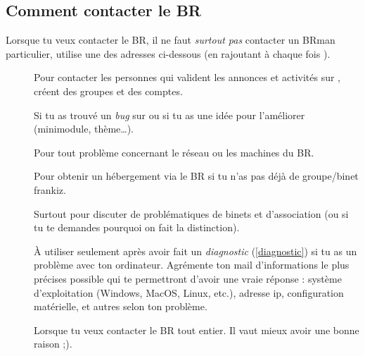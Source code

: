 \subsection{Comment contacter le BR}

Lorsque tu veux contacter le BR, il ne faut \emph{surtout pas} contacter un BRman particulier, utilise une des adresses ci-dessous (en rajoutant à chaque fois ).

\begin{description}

\item[] Pour contacter les personnes qui valident les annonces et activités sur \fkz, créent des groupes et des comptes.

\item[] Si tu as trouvé un \emph{bug} sur \fkz ou si tu as une idée pour l'améliorer (minimodule, thème\dots).

\item[] Pour tout problème concernant le réseau ou les machines du BR.

\item[] Pour obtenir un hébergement via le BR si tu n'as pas déjà de groupe/binet frankiz.



\item[] Surtout pour discuter de problématiques de binets et d'association (ou si tu te demandes pourquoi on fait la distinction).


\item[] À utiliser seulement après avoir fait un \emph{diagnostic} (\ref{diagnostic}) si tu as un problème avec ton ordinateur. Agrémente ton mail d'informations le plus précises possible qui te permettront d'avoir une vraie réponse : système d'exploitation (Windows, MacOS, Linux, etc.), adresse ip, configuration matérielle, et autres selon ton problème.


\item[] Lorsque tu veux contacter le BR tout entier. Il vaut mieux avoir une bonne raison ;).

\end{description}
